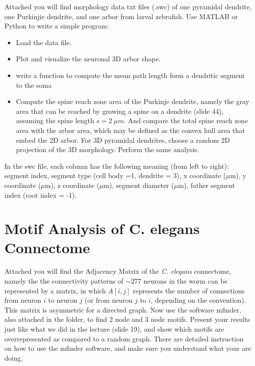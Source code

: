 \documentclass{article}
\begin{document}
Attached you will find morphology data txt files (.swc) of one pyramidal dendrite, one Purkinjie dendrite, and one arbor from larval zebrafish. Use MATLAB or Python to write a simple program: 
\begin{itemize}
\item Load the data file. 
\item Plot and visualize the neuronal 3D arbor shape. 
\item write a function to compute the mean path length form a dendritic segment to the soma
\item Compute the spine reach zone area of the Purkinje dendrite, namely the gray area that can be reached by growing a spine on a dendrite (slide 44), assuming the spine length $s = 2 ~\mu m$. And compare the total spine reach zone area with the arbor area, which may be defined as the convex hull area that embed the 2D arbor. For 3D pyramidal dendrites, choose a random 2D projection of the 3D morphology. Perform the same analysis. 
\end{itemize}
In the swc file, each column has the following meaning (from left to right): segment index, segment type (cell body =1, dendrite = 3), x coordinate ($\mu$m), y coordinate ($\mu$m), z coordinate ($\mu$m), segment diameter ($\mu$m), father segment index (root index = -1). 


\section*{Motif Analysis of C. elegans Connectome}

Attached you will find the Adjacency Matrix of the \textit{C. elegans} connectome, namely the the connectivity patterns of $\sim 277$ neurons in the worm can be represented by a matrix, in which $A[i,j] $ represents the number of connections from neuron $i$ to neuron $j$ (or from neuron $j$ to $i$, depending on the convention).  This matrix is asymmetric for a directed graph. Now use the software mfinder, also attached in the folder, to find 2 node and 3 node motifs. Present your results just like what we did in the lecture (slide 19), and show which motifs are overrepresented as compared to a random graph. There are detailed instruction on how to use the mfinder software, and make sure you understand what your are doing. 
\end{document}
